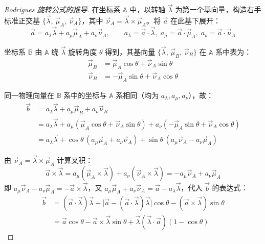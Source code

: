 \begin{proof}[Rodrigues 旋转公式的推导]
在坐标系 $\mathbb{A}$ 中，以转轴 $\vec{\lambda}$ 为第一个基向量，构造右手标准正交基 $\{\vec{\lambda},\,\vec{\mu}_A,\,\vec{\nu}_A\}$，其中 $\vec{\nu}_A = \vec{\lambda}\times\vec{\mu}_A$。将 $\vec{a}$ 在此基下展开：
\[
\vec{a} = a_\lambda\vec{\lambda} + a_\mu\vec{\mu}_A + a_\nu\vec{\nu}_A,
\qquad
a_\lambda = \vec{a}\cdot\vec{\lambda},\;
a_\mu = \vec{a}\cdot\vec{\mu}_A,\;
a_\nu = \vec{a}\cdot\vec{\nu}_A
\]

坐标系 $\mathbb{B}$ 由 $\mathbb{A}$ 绕 $\vec{\lambda}$ 旋转角度 $\theta$ 得到，其基向量 $\{\vec{\lambda},\,\vec{\mu}_B,\,\vec{\nu}_B\}$ 在 $\mathbb{A}$ 系中表为：
\begin{align*}
    \vec{\mu}_B &= \vec{\mu}_A\cos\theta + \vec{\nu}_A\sin\theta \\
    \vec{\nu}_B &= -\vec{\mu}_A\sin\theta + \vec{\nu}_A\cos\theta
\end{align*}

同一物理向量在 $\mathbb{B}$ 系中的坐标与 $\mathbb{A}$ 系相同（均为 $a_\lambda,a_\mu,a_\nu$），故：
\begin{align*}
    \vec{b} &= a_\lambda\vec{\lambda} + a_\mu\vec{\mu}_B + a_\nu\vec{\nu}_B \\
            &= a_\lambda\vec{\lambda} + a_\mu(\vec{\mu}_A\cos\theta + \vec{\nu}_A\sin\theta)
                                     + a_\nu(-\vec{\mu}_A\sin\theta + \vec{\nu}_A\cos\theta) \\
            &= a_\lambda\vec{\lambda} + \cos\theta\,(a_\mu\vec{\mu}_A + a_\nu\vec{\nu}_A)
                                     + \sin\theta\,(a_\mu\vec{\nu}_A - a_\nu\vec{\mu}_A)
\end{align*}

由 $\vec{\nu}_A = \vec{\lambda}\times\vec{\mu}_A$ 计算叉积：
\[
\vec{a}\times\vec{\lambda} = a_\mu(\vec{\mu}_A\times\vec{\lambda}) + a_\nu(\vec{\nu}_A\times\vec{\lambda})
                          = -a_\mu\vec{\nu}_A + a_\nu\vec{\mu}_A
\]
即 $a_\mu\vec{\nu}_A - a_\nu\vec{\mu}_A = -\vec{a}\times\vec{\lambda}$，又 $a_\mu\vec{\mu}_A + a_\nu\vec{\nu}_A = \vec{a} - a_\lambda\vec{\lambda}$，代入 $\vec{b}$ 的表达式：
\begin{align*}
    \vec{b} &= (\vec{a}\cdot\vec{\lambda})\vec{\lambda}
             + \bigl[\vec{a} - (\vec{a}\cdot\vec{\lambda})\vec{\lambda}\bigr]\cos\theta
             - (\vec{a}\times\vec{\lambda})\sin\theta \\[4pt]
            &= \vec{a}\cos\theta - \vec{a}\times\vec{\lambda}\sin\theta
             + \vec{\lambda}(\vec{\lambda}\cdot\vec{a})(1-\cos\theta)
\end{align*}
\end{proof}

